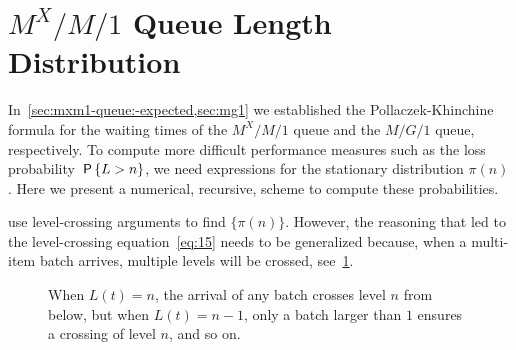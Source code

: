 


\section{$M^X/M/1$ Queue Length Distribution}\label{sec:batch-arrivals}


In~\cref{sec:mxm1-queue:-expected,sec:mg1} we established the Pollaczek-Khinchine formula for the waiting times of the $M^X/M/1$ queue and the $M/G/1$ queue, respectively.
To compute more difficult performance measures such as the loss probability $\,\mathsf{P}\left\{L>n\right\}$, we need expressions for the stationary distribution $\pi(n)$. 
Here we present a numerical, recursive, scheme to compute these probabilities.


 use level-crossing arguments to find $\{\pi(n)\}$.
However, the reasoning that led to the level-crossing equation~\cref{eq:15} needs to be generalized because, when a multi-item batch arrives, multiple levels will be crossed, see~\cref{fig:levelcrossing}.


\begin{figure}[ht]
\centering
{}

\caption{When $L(t)=n$, the arrival of any batch crosses level $n$ from below, but when $L(t)=n-1$, only a batch larger than $1$ ensures a crossing of level $n$, and so on.} \label{fig:levelcrossing}
\end{figure}

